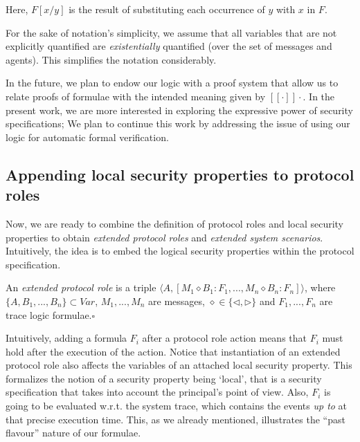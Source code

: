 \documentclass{entcs} \usepackage{entcsmacro}
\newcommand{\IO}{\ensuremath{\diamond}}
\newcommand{\IN}{\ensuremath{\triangleleft}}
\newcommand{\OUT}{\ensuremath{\triangleright}}
\newcommand{\HB}{\hfill{$\square$}}
\begin{document}
Here, $F[x / y]$ is the result of substituting each occurrence of $y$ with $x$ in $F$.

For the sake of notation's simplicity, we assume that all variables
that are not explicitly quantified are \emph{existentially} quantified
(over the set of messages and agents).  This simplifies the notation
considerably.

In the future, we plan to endow our logic with a proof system that
allow us to relate proofs of formulae with the intended meaning given
by $[\![ \cdot ]\!]\cdot$. In the present work, we are more interested
in exploring the expressive power of security specifications; We plan
to continue this work by addressing the issue of using our logic for
automatic formal verification.


\subsection{Appending local security properties to protocol roles}
Now, we are ready to combine the definition of protocol roles and local security properties
 to obtain \emph{extended protocol roles} and \emph{extended
  system scenarios}. Intuitively, the idea is to embed the logical
security properties within the protocol specification.

\begin{definition}
  An \emph{extended protocol role} is a triple $\langle A , [M_1 \IO
  B_1 : F_1, ..., M_n \IO B_n : F_n ] \rangle$, where $\{A,
  B_1, ..., B_n\} \subset Var$, $M_1,...,M_n$ are messages, $\IO \in
  \{ \IN, \OUT \}$ and $F_1,...,F_n$ are trace logic
  formulae.\HB
\end{definition}

Intuitively, adding a formula $F_i$ after a protocol role action means
that $F_i$ must hold after the execution of the action.  Notice that
instantiation of an extended protocol role also affects the variables
of an attached local security property. This formalizes the notion of
a security property being `local', that is a security specification
that takes into account the principal's point of view.  Also, $F_i$ is
going to be evaluated w.r.t. the system trace, which contains the
events \emph{up to} at that precise execution time. This, as we already
mentioned, illustrates the ``past flavour'' nature of our formulae.
\end{document}
